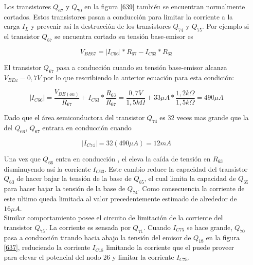 \documentclass[12pt,a4paper,final,headinclude,footinclude,BCOR5mm]{scrartcl}
\begin{document}
Los transistores $Q_{67}$ y $Q_{70}$ en la figura \ref{639} también se encuentran normalmente cortados. Estos transistores pasan a conducción para limitar la corriente a la carga $I_{L}$ y prevenir así la  destrucción de los transistores $Q_{74}$ y $Q_{75}$. Por ejemplo si el transistor $Q_{67}$ se encuentra cortado su tensión base-emisor es

$$ V_{BE67} = |I_{C66}|*R_{67} - I_{C63}*R_{63}$$

El transistor $Q_{67}$ pasa a conducción cuando su tensión base-emisor alcanza $V_{BEu} = 0,7 V$ por lo que rescribiendo la anterior ecuación para esta condición:

$$|I_{C66}| = \frac{V_{BE(on)}}{R_{67}} + I_{C63} * \frac{R_{63}}{R_{67}} = \frac{0,7 V}{1,5 k\Omega} + 33 \mu A * \frac{1,2 k\Omega}{1,5 k\Omega} = 490 \mu A$$

Dado que el área semiconductora del transistor $Q_{74}$ es 32 veces mas grande que la del $Q_{66}$, $Q_{67}$ entrara en conducción cuando

$$|I_{C74}| = 32(490 \mu A) = 12 mA$$

Una vez que $Q_{66}$ entra en conducción , el eleva la caída de tensión en $R_{63}$ disminuyendo así la corriente $I_{C63}$. Este cambio reduce la capacidad del transistor $Q_{63}$ de hacer bajar la tensión de la base de $Q_{65}$, el cual limita la capacidad de $Q_{65}$ para hacer bajar la tensión de la base de $Q_{74}$. Como consecuencia la corriente de este ultimo queda limitada al valor precedentemente estimado de alrededor de $16 \mu A$.\\

Similar comportamiento posee el circuito de limitación de la corriente del transistor $Q_{75}$. La corriente es sensada por $Q_{71}$. Cuando  $I_{C75}$ se hace grande, $Q_{70}$ pasa a conducción tirando hacia abajo la tensión del emisor de $Q_{18}$ en la figura \ref{637}, reduciendo la corriente $I_{C18}$ limitando la corriente que el puede proveer para elevar el potencial del nodo 26 y limitar la corriente $I_{C75}$.\\
\end{document}
